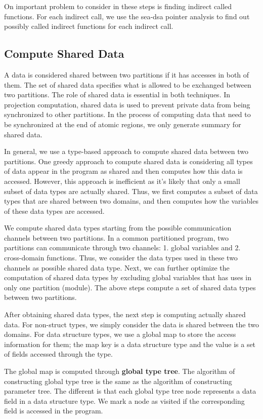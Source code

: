 \documentclass[pageno]{jpaper}
\begin{document}
On important problem to consider in these steps is finding indirect called functions. For each indirect call, we use the sea-dsa pointer analysis to find out possibly called indirect functions for each indirect call.

\subsection{Compute Shared Data}
A data is considered shared between two partitions if it has accesses in both of them. The set of shared data specifies what is allowed to be exchanged between two partitions. The role of shared data is essential in both techniques. In projection computation, shared data is used to prevent private data from being synchronized to other partitions. In the process of computing data that need to be synchronized at the end of atomic regions, we only generate summary for shared data.

In general, we use a type-based approach to compute shared data between two partitions. One greedy approach to compute shared data is considering all types of data appear in the program as shared and then computes how this data is accessed. However, this approach is inefficient as it's likely that only a small subset of data types are actually shared. Thus, we first computes a subset of data types that are shared between two domains, and then computes how the variables of these data types are accessed. 

We compute shared data types starting from the possible communication channels between two partitions. In a common partitioned program, two partitions can communicate through two channels: 1. global variables and 2. cross-domain functions. Thus, we consider the data types used in these two channels as possible shared data type. Next, we can further optimize the computation of shared data types by excluding global variables that has uses in only one partition (module). The above steps compute a set of shared data types between two partitions. 

After obtaining shared data types, the next step is computing actually shared data. For non-struct types, we simply consider the data is shared between the two domains. For data structure types, we use a global map to store the access information for them; the map key is a data structure type and the value is a set of fields accessed through the type. 

The global map is computed through \textbf{global type tree}. The algorithm of constructing global type tree is the same as the algorithm of constructing parameter tree. The different is that each global type tree node represents a data field in a data structure type. We mark a node as visited if the corresponding field is accessed in the program.
\end{document}
